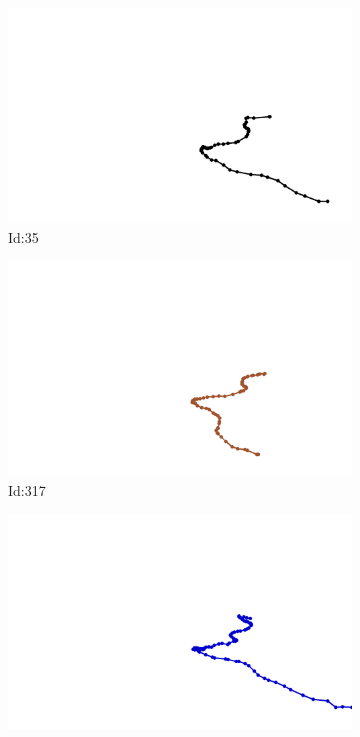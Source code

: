 \documentclass[12pt,twoside]{report}
\begin{document}
\begin{figure}
\centering
\begin{subfigure}[b]{0.20\textwidth}
\centering
\includegraphics[width=\textwidth]{../../trajectories/35.png}
\caption{Id:35}
\end{subfigure}
\begin{subfigure}[b]{0.20\textwidth}
\centering
\includegraphics[width=\textwidth]{../../trajectories/317.png}
\caption{Id:317}
\end{subfigure}
\begin{subfigure}[b]{0.20\textwidth}
\centering
\includegraphics[width=\textwidth]{../../trajectories/396.png}

\end{subfigure}
\end{figure}
\end{document}
